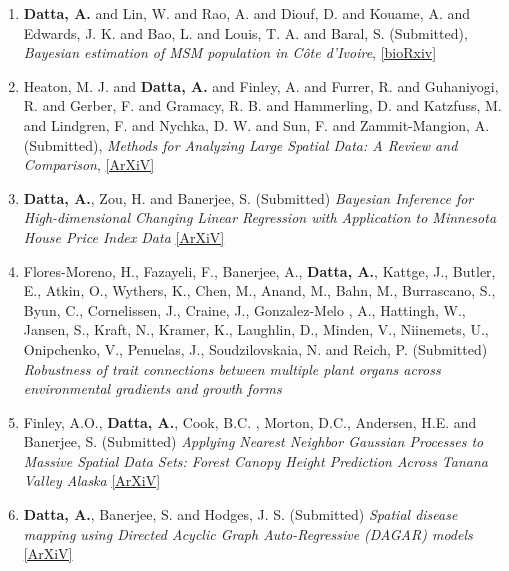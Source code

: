 \documentclass[11pt,a4paper,sans]{moderncv} %
\begin{document}
{\begin{enumerate}
\noindent \section{Submitted Papers}

\item \vskip 4mm \textbf{Datta, A.} and Lin, W. and Rao, A. and Diouf, D. and Kouame, A. and Edwards, J. K. and Bao, L. and Louis, T. A. and Baral, S. (Submitted), {\em Bayesian estimation of MSM population in C{\^o}te d'Ivoire}, \href{https://www.biorxiv.org/content/early/2017/11/10/213926.full.pdf}{[bioRxiv]}

\item \vskip 4mm Heaton, M. J. and \textbf{Datta, A.} and Finley, A. and Furrer, R. and Guhaniyogi, R. and Gerber, F. and Gramacy, R. B. and Hammerling, D. and Katzfuss, M. and Lindgren, F. and Nychka, D. W. and Sun, F. and Zammit-Mangion, A. (Submitted), {\em Methods for Analyzing Large Spatial Data: A Review and Comparison}, \href{https://arxiv.org/pdf/1710.05013.pdf}{[ArXiV]}

\item \vskip 4mm \textbf{Datta, A.}, Zou, H. and Banerjee, S. (Submitted) {\em Bayesian Inference for High-dimensional Changing Linear Regression with Application to Minnesota House Price Index Data}  \href{https://arxiv.org/pdf/1510.07129.pdf}{[ArXiV]}

\item \vskip 2mm Flores-Moreno, H.,   Fazayeli, F.,   Banerjee, A.,   \textbf{Datta, A.},   Kattge, J.,   Butler, E.,   Atkin, O.,   Wythers, K.,   Chen, M.,   Anand, M.,   Bahn, M.,   Burrascano, S.,   Byun, C.,   Cornelissen, J.,   Craine, J.,   Gonzalez-Melo , A.,   Hattingh, W.,   Jansen, S.,   Kraft, N.,   Kramer, K.,   Laughlin, D.,   Minden, V.,  Niinemets, U.,   Onipchenko, V., Penuelas, J.,   Soudzilovskaia, N.   and   Reich, P. (Submitted) {\em Robustness of trait connections between multiple plant organs across environmental gradients and growth forms}

\item \vskip 4mm Finley, A.O., \textbf{Datta, A.}, Cook, B.C. ,  Morton, D.C., Andersen, H.E. and Banerjee, S. (Submitted) {\em Applying Nearest Neighbor Gaussian Processes to Massive Spatial Data Sets: Forest Canopy Height Prediction Across Tanana Valley Alaska} \href{https://arxiv.org/pdf/1702.00434.pdf}{[ArXiV]}

\item \vskip 4mm \textbf{Datta, A.}, Banerjee, S. and Hodges, J. S. (Submitted) {\em Spatial disease mapping using Directed Acyclic Graph Auto-Regressive (DAGAR) models} \href{https://arxiv.org/pdf/1704.07848.pdf}{[ArXiV]}


\end{enumerate}}
\end{document}
